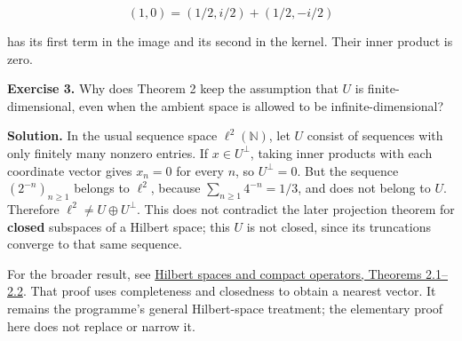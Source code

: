 \documentclass[
  english,
]{article}
\begin{document}
\[
(1,0)=(1/2,i/2)+(1/2,-i/2)
\]

has its first term in the image and its second in the kernel. Their
inner product is zero.

\textbf{Exercise 3.} Why does Theorem 2 keep the assumption that \(U\)
is finite-dimensional, even when the ambient space is allowed to be
infinite-dimensional?

\textbf{Solution.} In the usual sequence space \(\ell^2(\mathbb N)\),
let \(U\) consist of sequences with only finitely many nonzero entries.
If \(x\in U^\perp\), taking inner products with each coordinate vector
gives \(x_n=0\) for every \(n\), so \(U^\perp=0\). But the sequence
\((2^{-n})_{n\ge1}\) belongs to \(\ell^2\), because
\(\sum_{n\ge1}4^{-n}=1/3\), and does not belong to \(U\). Therefore
\(\ell^2\ne U\oplus U^\perp\). This does not contradict the later
projection theorem for \textbf{closed} subspaces of a Hilbert space;
this \(U\) is not closed, since its truncations converge to that same
sequence.

For the broader result, see
\href{https://kokunoyumeto.github.io/open-mathematics-courses/courses/foundations-of-von-neumann-algebras/hilbert-spaces-and-compact-operators.html\#OA-FND-HS-02}{Hilbert
spaces and compact operators, Theorems 2.1--2.2}. That proof uses
completeness and closedness to obtain a nearest vector. It remains the
programme's general Hilbert-space treatment; the elementary proof here
does not replace or narrow it.
\end{document}
